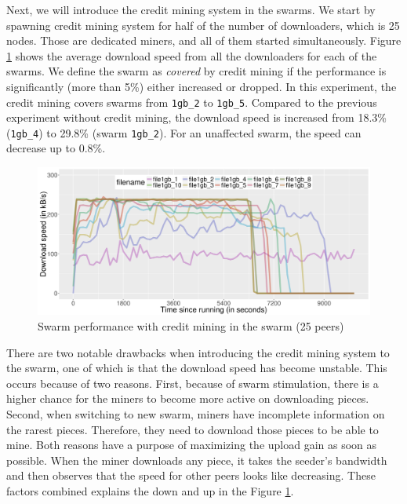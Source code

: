Next, we will introduce the credit mining system in the swarms. We start by spawning credit mining system for half of the number of downloaders, which is 25 nodes. Those are dedicated miners, and all of them started simultaneously. Figure \ref{fig:swarmcm25perf} shows the average download speed from all the downloaders for each of the swarms. We define the swarm as \textit{covered} by credit mining if the performance is significantly (more than 5\%) either increased or dropped. In this experiment, the credit mining covers swarms from \texttt{1gb\_2} to \texttt{1gb\_5}. Compared to the previous experiment without credit mining, the download speed is increased from 18.3\% (\texttt{1gb\_4}) to 29.8\% (swarm \texttt{1gb\_2}). For an unaffected swarm, the speed can decrease up to 0.8\%.

\begin{figure}[h!]
	\centering
	\includegraphics[width=\textwidth]{pics/results/swperf_sc2_25.png}
	\caption{Swarm performance with credit mining in the swarm (25 peers)}
	\label{fig:swarmcm25perf}
\end{figure}

There are two notable drawbacks when introducing the credit mining system to the swarm, one of which is that the download speed has become unstable. This occurs because of two reasons. First, because of swarm stimulation, there is a higher chance for the miners to become more active on downloading pieces. Second, when switching to new swarm, miners have incomplete information on the rarest pieces. Therefore, they need to download those pieces to be able to mine. Both reasons have a purpose of maximizing the upload gain as soon as possible. When the miner downloads any piece, it takes the seeder's bandwidth and then observes that the speed for other peers looks like decreasing. These factors combined explains the down and up in the Figure \ref{fig:swarmcm25perf}.


